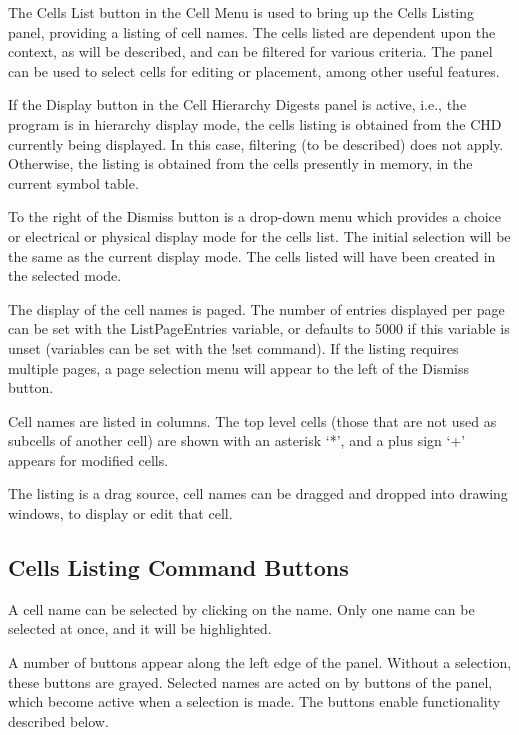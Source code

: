 The {\cb Cells List} button in the {\cb Cell Menu} is used to bring up
the {\cb Cells Listing} panel, providing a listing of cell names.  The
cells listed are dependent upon the context, as will be described, and
can be filtered for various criteria.  The panel can be used to select
cells for editing or placement, among other useful features.

If the {\cb Display} button in the {\cb Cell Hierarchy Digests} panel
is active, i.e., the program is in hierarchy display mode, the cells
listing is obtained from the CHD currently being displayed.  In this
case, filtering (to be described) does not apply.  Otherwise, the
listing is obtained from the cells presently in memory, in the current
symbol table.

To the right of the {\cb Dismiss} button is a drop-down menu which
provides a choice or electrical or physical display mode for the cells
list.  The initial selection will be the same as the current display
mode.  The cells listed will have been created in the selected mode. 

The display of the cell names is paged.  The number of entries
displayed per page can be set with the {\et ListPageEntries} variable,
or defaults to 5000 if this variable is unset (variables can be set
with the {\cb !set} command).  If the listing requires multiple pages,
a page selection menu will appear to the left of the {\cb Dismiss}
button.

Cell names are listed in columns.  The top level cells (those that are
not used as subcells of another cell) are shown with an asterisk `*',
and a plus sign `+' appears for modified cells.

The listing is a drag source, cell names can be dragged and dropped
into drawing windows, to display or edit that cell.

\subsection{Cells Listing Command Buttons}

A cell name can be selected by clicking on the name.  Only one name
can be selected at once, and it will be highlighted.

A number of buttons appear along the left edge of the panel.  Without
a selection, these buttons are grayed.  Selected names are acted on by
buttons of the panel, which become active when a selection is made. 
The buttons enable functionality described below.

